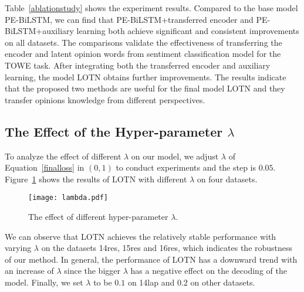 \documentclass[letterpaper]{article} \usepackage{aaai20}  \usepackage{times}  \usepackage{helvet} \usepackage{courier}  \usepackage[hyphens]{url}  \usepackage{graphicx} \urlstyle{rm} \def\UrlFont{\rm}  \usepackage{graphicx}
\begin{document}
Table~\ref{ablationstudy} shows the experiment results. Compared to the base model PE-BiLSTM, we can find that PE-BiLSTM+transferred encoder and PE-BiLSTM+auxiliary learning both achieve significant and consistent improvements on all datasets. The comparisons validate the effectiveness of transferring the encoder and latent opinion words from sentiment classification model for the TOWE task. After integrating both the transferred encoder and auxiliary learning, the model LOTN obtains further improvements. The results indicate that the proposed two methods are useful for the final model LOTN and they transfer opinions knowledge from different perspectives.

\subsection{The Effect of the Hyper-parameter $\lambda$}
\noindent To analyze the effect of different $\lambda$ on our model, we adjust $\lambda$ of Equation~\ref{finalloss} in $(0, 1)$ to conduct experiments and the step is $0.05$. Figure~\ref{hyperparameter} shows the results of LOTN with different $\lambda$ on four datasets.
\begin{figure}[ht]
	\centering
	\texttt{[image: lambda.pdf]}
	\caption{The effect of different hyper-parameter $\lambda$.}
	\label{hyperparameter}
\end{figure}

We can observe that LOTN achieves the relatively stable performance with varying $\lambda$ on the datasets 14res, 15res and 16res, which indicates the robustness of our method. In general, the performance of LOTN has a downward trend with an increase of $\lambda$ since the bigger $\lambda$ has a negative effect on the decoding of the model. Finally, we set $\lambda$ to be $0.1$ on 14lap and $0.2$ on other datasets.
\end{document}
